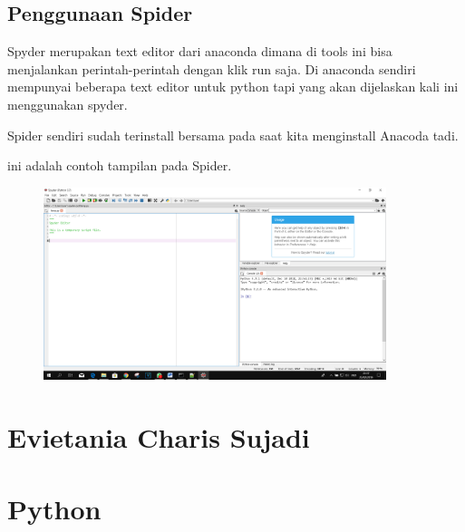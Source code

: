 \subsection{Penggunaan Spider}
Spyder merupakan text editor dari anaconda dimana di tools ini bisa menjalankan perintah-perintah dengan klik run saja.
Di anaconda sendiri mempunyai beberapa text editor untuk python tapi yang akan dijelaskan kali ini menggunakan spyder.

Spider sendiri sudah terinstall bersama pada saat kita menginstall Anacoda tadi.

ini adalah contoh tampilan pada Spider.
\begin{figure}[H]
		\includegraphics[width=10cm]{figures/fahmi/3.png}
		\centering
	\end{figure}
\section{Evietania Charis Sujadi}

\section{Python}
